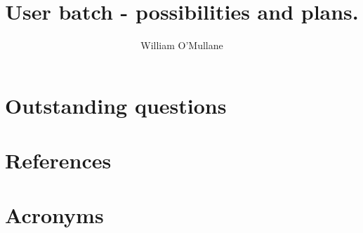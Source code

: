 \documentclass[DM,authoryear,toc]{lsstdoc}
\title{User batch - possibilities and plans.}
\author{%
William O'Mullane
}
\date{\vcsDate}
\begin{document}
\mkshorttitle




\appendix
\section{Outstanding questions}
\listofactions
\section{References} \label{sec:bib}
\renewcommand{\refname}{} %


\section{Acronyms} \label{sec:acronyms}

\end{document}
